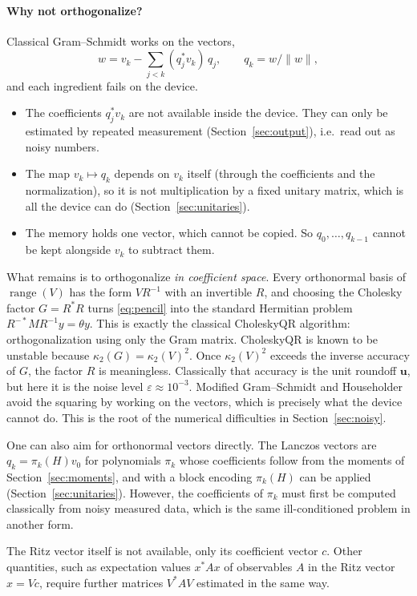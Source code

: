 \documentclass[11pt,a4paper]{article}
\begin{document}
\paragraph{Why not orthogonalize?} Classical Gram--Schmidt works on the
vectors,
\[
  w = v_k-\sum_{j<k}(q_j^*v_k)\,q_j,\qquad q_k = w/\|w\| ,
\]
and each ingredient fails on the device.
\begin{itemize}
\item The coefficients $q_j^*v_k$ are not available inside the device.
  They can only be estimated by repeated measurement
  (Section~\ref{sec:output}), i.e.\ read out as noisy numbers.
\item The map $v_k\mapsto q_k$ depends on $v_k$ itself (through the
  coefficients and the normalization), so it is not multiplication by a
  fixed unitary matrix, which is all the device can do
  (Section~\ref{sec:unitaries}).
\item The memory holds one vector, which cannot be copied. So
  $q_0,\dots,q_{k-1}$ cannot be kept alongside $v_k$ to subtract them.
\end{itemize}
What remains is to orthogonalize \emph{in coefficient space}. Every
orthonormal basis of $\operatorname{range}(V)$ has the form $VR^{-1}$ with an
invertible $R$, and choosing the Cholesky factor $G=R^*R$ turns
\eqref{eq:pencil} into the standard Hermitian problem
$R^{-*}MR^{-1}y=\theta y$. This is exactly the classical CholeskyQR
algorithm: orthogonalization using only the Gram matrix. CholeskyQR is
known to be unstable because $\kappa_2(G)=\kappa_2(V)^2$. Once $\kappa_2(V)^2$
exceeds the inverse accuracy of $G$, the factor $R$ is meaningless.
Classically that accuracy is the unit roundoff $\mathbf u$, but here it
is the noise level $\varepsilon\approx10^{-3}$. Modified Gram--Schmidt and
Householder avoid the squaring by working on the vectors, which is
precisely what the device cannot do. This is the root of the numerical
difficulties in Section~\ref{sec:noisy}.

One can also aim for orthonormal vectors directly. The Lanczos vectors
are $q_k=\pi_k(H)v_0$ for polynomials $\pi_k$ whose coefficients follow
from the moments of Section~\ref{sec:moments}, and with a block encoding
$\pi_k(H)$ can be applied (Section~\ref{sec:unitaries}). However, the
coefficients of $\pi_k$ must first be computed classically from noisy
measured data, which is the same ill-conditioned problem in another
form.

The Ritz vector itself is not available, only its coefficient
vector $c$. Other quantities, such as expectation values $x^*Ax$ of
observables $A$ in the Ritz vector $x=Vc$, require further matrices
$V^*AV$ estimated in the same way.
\end{document}
